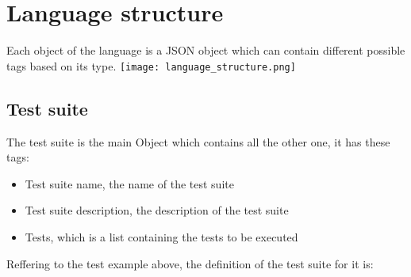 

\section{Language structure}
Each object of the language is a JSON object which can contain different possible tags based on its type.
\texttt{[image: language\_structure.png]}

\subsection{Test suite}
The test suite is the main Object which contains all the other one, it has these tags:
\begin{itemize}
    \item Test suite name, the name of the test suite
    \item Test suite description, the description of the test suite
    \item Tests, which is a list containing the tests to be executed
\end{itemize}
Reffering to the test example above, the definition of the test suite for it is:

